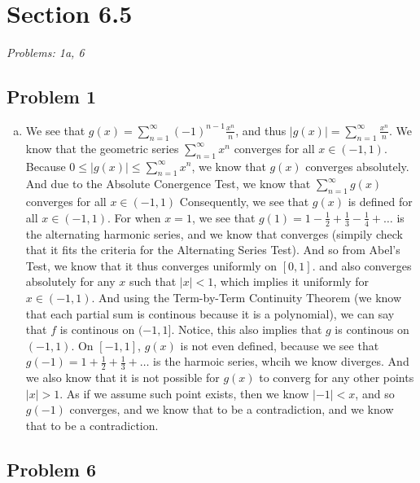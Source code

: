 \documentclass[12pt]{article}
\begin{document}

\section*{Section 6.5}
\textit{Problems: 1a, 6}

\subsection*{Problem 1}
\begin{enumerate}[a).]
    \item {
        We see that $g(x) = \sum_{n = 1}^{\infty}(-1)^{n-1}\frac{x^n}{n}$, and thus $|g(x)| = \sum_{n=1}^{\infty}\frac{x^n}{n}$. 
        We know that the geometric series $\sum_{n=1}^{\infty}x^n$ converges for all $x \in (-1,1)$. 
        Because $0 \le |g(x)| \le \sum_{n=1}^{\infty}x^n$, we know that $g(x)$ converges absolutely.
        And due to the Absolute Conergence Test, we know that $\sum_{n=1}^{\infty}g(x)$ converges for all $x \in (-1,1)$
        Consequently, we see that $g(x)$ is defined for all $x \in (-1,1)$. 
        For when $x = 1$, we see that $g(1) = 1 - \frac{1}{2} + \frac{1}{3} - \frac{1}{4} + \dots$ is the alternating harmonic series, and we know that converges (simpily check that it fits the criteria for the Alternating Series Test). 
        And so from Abel's Test, we know that it thus converges uniformly on $[0,1]$. and also converges absolutely for any $x$ such that $|x|<1$, which implies it uniformly for $x \in (-1,1)$. 
        And using the Term-by-Term Continuity Theorem (we know that each partial sum is continous because it is a polynomial), we can say that $f$ is continous on $(-1,1]$. 
        Notice, this also implies that $g$ is continous on $(-1,1)$. 
        On $[-1,1]$, $g(x)$ is not even defined, because we see that $g(-1) = 1 + \frac{1}{2} + \frac{1}{3} + \dots$ is the harmoic series, whcih we know diverges. 
        And we also know that it is not possible for $g(x)$ to converg for any other points $|x|>1$. 
        As if we assume such point exists, then we know $|-1| < x$, and so $g(-1)$ converges, and we know that to be a contradiction, and we know that to be a contradiction. 
    }
\end{enumerate}

\subsection*{Problem 6}
\end{document}
